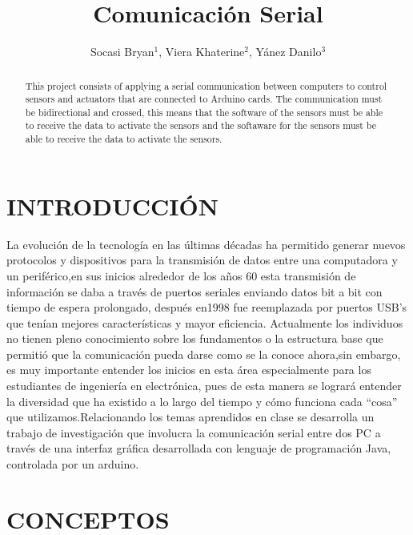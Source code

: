 \documentclass[letterpaper, 10 pt, conference]{ieeeconf}
\title{\LARGE \bf
Comunicación Serial
}
\author{Socasi Bryan$^{1}$, Viera Khaterine$^{2}$, Yánez Danilo$^{3}$%
}
\begin{document}
\maketitle
\thispagestyle{empty}
\pagestyle{empty}
\begin{abstract}

This project consists of applying a serial communication between computers to control sensors and actuators that are connected to Arduino cards. The communication must be bidirectional and crossed, this means that the software of the sensors must be able to receive the data to activate the sensors and the softaware for the sensors must be able to receive the data to activate the sensors.

\end{abstract}


\section{INTRODUCCIÓN}

La evolución de la tecnología en las últimas décadas ha permitido generar nuevos protocolos y dispositivos para la transmisión de datos entre una computadora y un periférico,en sus inicios alrededor de los años 60 esta transmisión de información se daba a través de puertos seriales enviando datos bit a bit con tiempo de espera prolongado, después en1998 fue reemplazada por puertos USB’s que tenían mejores características y mayor eficiencia. Actualmente los individuos no tienen pleno conocimiento sobre los fundamentos o la estructura base que permitió que la comunicación pueda darse como se la conoce ahora,sin embargo, es muy importante entender los inicios en esta área especialmente para los estudiantes de ingeniería en electrónica, pues de esta manera se logrará entender la diversidad que ha existido a lo largo del tiempo y cómo funciona cada “cosa” que utilizamos.Relacionando los temas aprendidos en clase se desarrolla un trabajo de investigación que involucra la comunicación serial entre dos PC a través de una interfaz gráfica desarrollada con lenguaje de programación Java, controlada por un arduino.

\section{CONCEPTOS}
\end{document}
